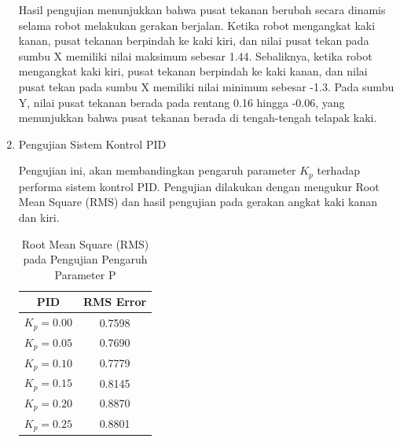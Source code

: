 \begin{enumerate}[label=\Alph*.]
        \hspace*{1em} Hasil pengujian menunjukkan bahwa pusat tekanan berubah secara dinamis selama robot melakukan gerakan berjalan. Ketika robot mengangkat kaki kanan, pusat tekanan berpindah ke kaki kiri, dan nilai pusat tekan pada sumbu X memiliki nilai maksimum sebesar 1.44. Sebaliknya, ketika robot mengangkat kaki kiri, pusat tekanan berpindah ke kaki kanan, dan nilai pusat tekan pada sumbu X memiliki nilai minimum sebesar -1.3. Pada sumbu Y, nilai pusat tekanan berada pada rentang 0.16 hingga -0.06, yang menunjukkan bahwa pusat tekanan berada di tengah-tengah telapak kaki.

    \item Pengujian Sistem Kontrol PID
    \label{subsec:hasil-pembahasan-pid}

        \hspace*{1em} Pengujian ini, akan membandingkan pengaruh parameter \(K_p\) terhadap performa sistem kontrol PID. Pengujian dilakukan dengan mengukur Root Mean Square (RMS) dan hasil pengujian pada gerakan angkat kaki kanan dan kiri. 

        \begin{table}[h]
            \centering
            \caption{Root Mean Square (RMS) pada Pengujian Pengaruh Parameter P}
            \begin{tabular}{|c|c|}
            \hline
            \textbf{PID} & \textbf{RMS Error} \\
            \hline
            $K_p = 0.00$ & 0.7598 \\
            $K_p = 0.05$ & 0.7690 \\
            $K_p = 0.10$ & 0.7779 \\
            $K_p = 0.15$ & 0.8145 \\
            $K_p = 0.20$ & 0.8870 \\
            $K_p = 0.25$ & 0.8801 \\
            \hline
            \end{tabular}
            \label{tab:ems_p}
        \end{table}


\end{enumerate}
